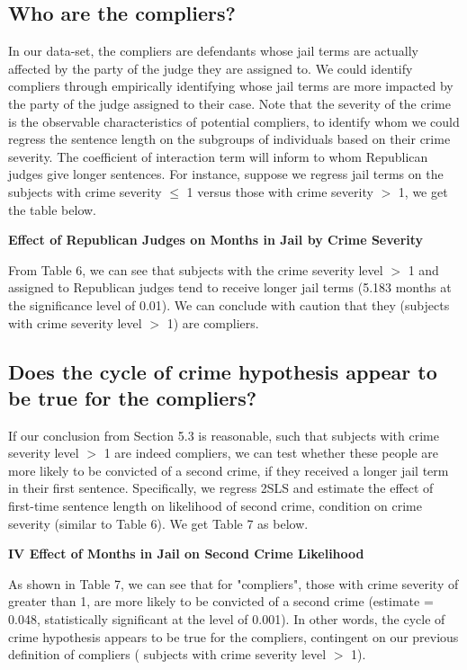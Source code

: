 \documentclass[12pt]{article}
\begin{document}
\subsection{Who are the compliers?}

In our data-set, the compliers are defendants whose jail terms are actually affected by the party of the judge they are assigned to. We could identify compliers through empirically identifying whose jail terms are more impacted by the party of the judge assigned to their case. Note that the severity of the crime is the observable characteristics of potential compliers, to identify whom we could regress the sentence length on the subgroups of individuals based on their crime severity. The coefficient of interaction term will inform to whom Republican judges give longer sentences. For instance, suppose we regress jail terms on the subjects with crime severity $\le$ 1 versus those with crime severity $>$ 1, we get the table below.

\begin{table}[H]
    \begin{center} 
     \caption{\textbf{Effect of Republican Judges on Months in Jail by Crime Severity}}
    \label{tab:balance}
    
    \end{center}
\end{table}

From Table 6, we can see that subjects with the crime severity level $>$ 1 and assigned to Republican judges tend to receive longer jail terms (5.183 months at the significance level of 0.01). We can conclude with caution that they (subjects with crime severity level $>$ 1) are compliers.

\subsection{Does the cycle of crime hypothesis appear to be true for the compliers?}

If our conclusion from Section 5.3 is reasonable, such that subjects with crime severity level $>$ 1 are indeed compliers, we can test whether these people are more likely to be convicted of a second crime, if they received a longer jail term in their first sentence. Specifically, we regress 2SLS and estimate the effect of first-time sentence length on likelihood of second crime, condition on crime severity (similar to Table 6). We get Table 7 as below. 

\begin{table}[H]
    \begin{center} 
     \caption{\textbf{IV Effect of Months in Jail on Second Crime Likelihood}}
    \label{tab:balance}
    
    \end{center}
\end{table}

As shown in Table 7, we can see that for "compliers", those with crime severity of greater than 1, are more likely to be convicted of a second crime (estimate = 0.048, statistically significant at the level of 0.001). In other words, the cycle of crime hypothesis appears to be true for the compliers, contingent on our previous definition of compliers ( subjects with crime severity level $>$ 1).
\end{document}
